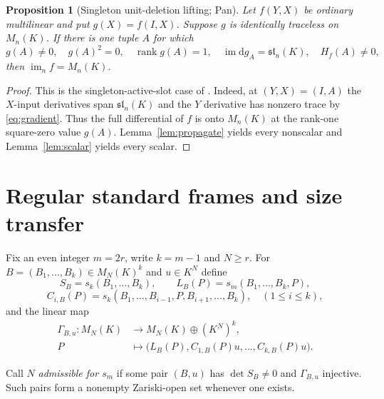 \documentclass[11pt,reqno]{amsart}
\newcommand{\im}{\operatorname{im}}
\newcommand{\dd}{\mathrm d}
\theoremstyle{plain}
\newtheorem{proposition}[theorem]{Proposition}
\theoremstyle{definition}
\numberwithin{equation}{section}
\begin{document}
\begin{proposition}[Singleton unit-deletion lifting; Pan]\label{prop:pan}
Let $f(Y,X)$ be ordinary multilinear and put $g(X)=f(I,X)$.  Suppose $g$ is identically traceless on $M_n(K)$.  If there is one tuple $A$ for which
\begin{equation}\label{eq:pan}
 g(A)\ne0,\quad g(A)^2=0,\quad \operatorname{rank}g(A)=1,\quad
 \im\dd g_A=\mathfrak{sl}_n(K),\quad H_f(A)\ne0,
\end{equation}
then $\im_n f=M_n(K)$.
\end{proposition}
\begin{proof}
This is the singleton-active-slot case of \cite[Corollary~9.7]{Pan2026}.  Indeed, at $(Y,X)=(I,A)$ the $X$-input derivatives span $\mathfrak{sl}_n(K)$ and the $Y$ derivative has nonzero trace by \eqref{eq:gradient}.  Thus the full differential of $f$ is onto $M_n(K)$ at the rank-one square-zero value $g(A)$.  Lemma~\ref{lem:propagate} yields every nonscalar and Lemma~\ref{lem:scalar} yields every scalar.
\end{proof}

\section{Regular standard frames and size transfer}\label{sec:cores}
Fix an even integer $m=2r$, write $k=m-1$ and $N\ge r$.  For $B=(B_1,\ldots,B_k)\in M_N(K)^k$ and $u\in K^N$ define
\[
 S_B=s_k(B_1,\ldots,B_k),\qquad L_B(P)=s_m(B_1,\ldots,B_k,P),
\]
\[
 C_{i,B}(P)=s_k(B_1,\ldots,B_{i-1},P,B_{i+1},\ldots,B_k),
 \quad(1\le i\le k),
\]
and the linear map
\begin{equation}\label{eq:gamma}
\begin{aligned}
 \Gamma_{B,u}:M_N(K)&\longrightarrow M_N(K)\oplus(K^N)^k,\\
 P&\longmapsto\bigl(L_B(P),C_{1,B}(P)u,\ldots,C_{k,B}(P)u\bigr).
\end{aligned}
\end{equation}
\par{}
\begin{samepage}
\noindent Call $N$ \emph{admissible for $s_m$} if some pair $(B,u)$ has
$\det S_B\ne0$ and $\Gamma_{B,u}$ injective.  Such pairs form a
nonempty Zariski-open set whenever one exists.
\end{samepage}
\end{document}

